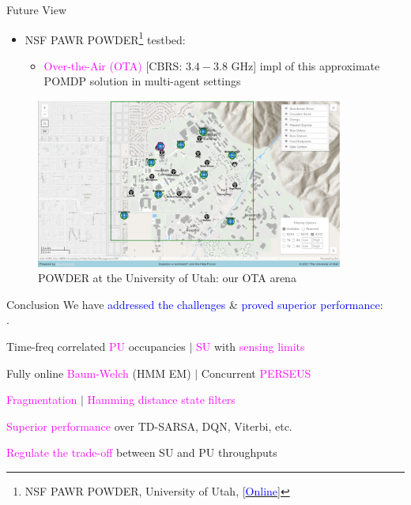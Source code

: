 \documentclass{beamer}
\begin{document}
\begin{frame}{Future View}
    \begin{itemize}
        \item \footnotesize{NSF PAWR POWDER\footnote{\tiny{NSF PAWR POWDER, University of Utah, [\href{http://docs.powderwireless.net/}{\textcolor{blue}{Online}}]}} testbed}:
        \begin{itemize}
            \item \footnotesize{\textcolor{magenta}{Over-the-Air (OTA)} [CBRS: $3.4{-}3.8$ GHz] impl of this approximate POMDP solution in multi-agent settings}
        \end{itemize}
    \end{itemize}
    \begin{figure}
        \centering
        \includegraphics[width = 0.9\textwidth]{figs/POWDER.PNG}
        \caption{POWDER at the University of Utah: our OTA arena}
        \label{fig:5d}
    \end{figure}
\end{frame}
\begin{frame}{Conclusion}
We have \textcolor{blue}{addressed the challenges} \& \textcolor{blue}{proved superior performance:}\\.
\begin{itemize}
    \footnotesize{
    \item Time-freq correlated \textcolor{magenta}{PU} occupancies $|$ \textcolor{magenta}{SU} with \textcolor{magenta}{sensing limits}
    \item Fully online \textcolor{magenta}{Baum-Welch} (HMM EM) $|$ Concurrent \textcolor{magenta}{PERSEUS}
    \item \textcolor{magenta}{Fragmentation} $|$ \textcolor{magenta}{Hamming distance state filters}
    \item \textcolor{magenta}{Superior performance} over TD-SARSA, DQN, Viterbi, etc.
    \item \textcolor{magenta}{Regulate the trade-off} between SU and PU throughputs}
\end{itemize}
\end{frame}
\end{document}
